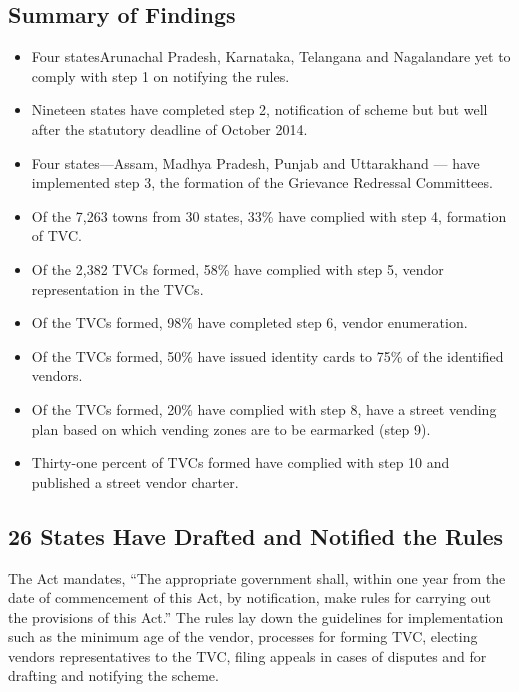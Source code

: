 \documentclass[a4paper, 12pt, twoside]{article}
\begin{document}
{\subsection*{Summary of Findings}

\begin{itemize}
	\item Four states\textemdash Arunachal Pradesh, Karnataka, Telangana and Nagaland\textemdash are yet to comply with step 1 on notifying the rules.
	\item Nineteen states have completed step 2, notification of scheme but but well after the statutory deadline of October 2014.
	\item Four states---Assam, Madhya Pradesh, Punjab and Uttarakhand --- have implemented step 3, the formation of the Grievance Redressal Committees.
	\item Of the 7,263 towns from 30 states, 33\% have complied with step 4, formation of TVC.
	\item Of the 2,382 TVCs formed, 58\% have complied with step 5, vendor representation in the TVCs.
	\item Of the TVCs formed, 98\% have completed step 6, vendor enumeration.
	\item Of the TVCs formed, 50\% have issued identity cards to 75\% of the identified vendors.
	\item Of the TVCs formed, 20\% have complied with step 8, have a street vending plan based on which vending zones are to be earmarked (step 9). %
	\item Thirty-one percent of TVCs formed have complied with step 10 and published a street vendor charter.
\end{itemize}

\subsection*{26 States Have Drafted and Notified the Rules}
	The Act mandates, “The appropriate government shall, within one year from the date of commencement of this Act, by notification, make rules for carrying out the provisions of this Act.” The rules lay down the guidelines for implementation such as the minimum age of the vendor, processes for forming TVC, electing vendors representatives to the TVC, filing appeals in cases of disputes and for drafting and notifying the scheme.

}
\end{document}
